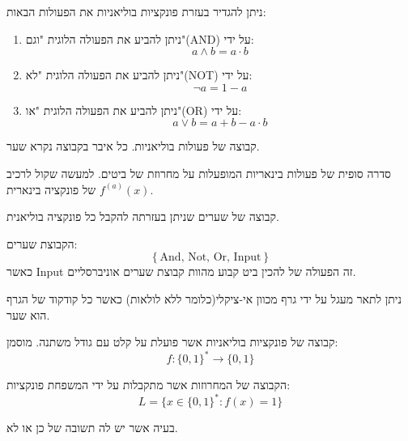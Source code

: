\documentclass{tstextbook}
\begin{document}
\begin{proposition}
ניתן להגדיר בעזרת פונקציות בוליאניות את הפעולות הבאות:

  \begin{enumerate}
    \item ניתן להביע את הפעולה הלוגית "וגם"(AND) על ידי: 
$$a\land b = a\cdot b$$


    \item ניתן להביע את הפעולה הלוגית "לא"(NOT) על ידי: 
$$\lnot a = 1- a$$


    \item ניתן להביע את הפעולה הלוגית "או"(OR) על ידי: 
$$a\lor b = a+b - a\cdot b$$


  \end{enumerate}
\end{proposition}
\begin{definition}
קבוצה של פעולות בוליאניות. כל איבר בקבוצה נקרא שער.

\end{definition}
\begin{definition}
סדרה סופית של פעולות בינאריות המופעלות על מחרוזת של ביטים. למעשה שקול לרכיב \(f^{(a)}(x)\) של פונקציה בינארית.

\end{definition}
\begin{definition}
קבוצה של שערים שניתן בעזרתה להקבל כל פונקציה בוליאנית.

\end{definition}
\begin{example}
הקבוצת שערים:
$$\left\{  \text{And, Not, Or, Input}  \right\}$$
כאשר Input זה הפעולה של להכין ביט קבוע מהוות קבוצת שערים אוניברסליים.

\end{example}
\begin{proposition}
ניתן לתאר מעגל על ידי גרף מכוון אי-ציקלי(כלומר ללא לולאות) כאשר כל קודקוד של הגרף הוא שער.

\end{proposition}
\begin{definition}
קבוצה של פונקציות בוליאניות אשר פועלת על קלט עם גודל משתנה.  מוסמן:
$$f:\{0,1\}^{*}\to\{0,1\}$$

\end{definition}
\begin{definition}[שפה]
הקבוצה של המחרוזות אשר מתקבלות על ידי המשפחת פונקציות:
$$L=\{x\in\{0,1\}^{*}:f(x)=1\}$$

\end{definition}
\begin{definition}
בעיה אשר יש לה תשובה של כן או לא.

\end{definition}
\end{document}
